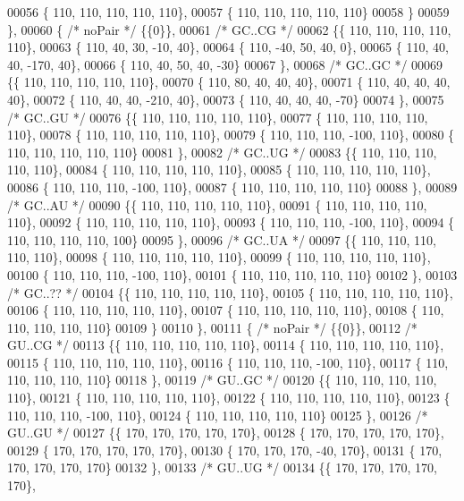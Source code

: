 \begin{DoxyCode}
00056 \{ 110, 110, 110, 110, 110\},
00057 \{ 110, 110, 110, 110, 110\}
00058 \}
00059 \},
00060 \{ \textcolor{comment}{/* noPair */} \{\{0\}\},
00061 \textcolor{comment}{/* GC..CG */}
00062 \{\{ 110, 110, 110, 110, 110\},
00063 \{ 110,  40,  30, -10,  40\},
00064 \{ 110, -40,  50,  40,   0\},
00065 \{ 110,  40,  40, -170,  40\},
00066 \{ 110,  40,  50,  40, -30\}
00067 \},
00068 \textcolor{comment}{/* GC..GC */}
00069 \{\{ 110, 110, 110, 110, 110\},
00070 \{ 110,  80,  40,  40,  40\},
00071 \{ 110,  40,  40,  40,  40\},
00072 \{ 110,  40,  40, -210,  40\},
00073 \{ 110,  40,  40,  40, -70\}
00074 \},
00075 \textcolor{comment}{/* GC..GU */}
00076 \{\{ 110, 110, 110, 110, 110\},
00077 \{ 110, 110, 110, 110, 110\},
00078 \{ 110, 110, 110, 110, 110\},
00079 \{ 110, 110, 110, -100, 110\},
00080 \{ 110, 110, 110, 110, 110\}
00081 \},
00082 \textcolor{comment}{/* GC..UG */}
00083 \{\{ 110, 110, 110, 110, 110\},
00084 \{ 110, 110, 110, 110, 110\},
00085 \{ 110, 110, 110, 110, 110\},
00086 \{ 110, 110, 110, -100, 110\},
00087 \{ 110, 110, 110, 110, 110\}
00088 \},
00089 \textcolor{comment}{/* GC..AU */}
00090 \{\{ 110, 110, 110, 110, 110\},
00091 \{ 110, 110, 110, 110, 110\},
00092 \{ 110, 110, 110, 110, 110\},
00093 \{ 110, 110, 110, -100, 110\},
00094 \{ 110, 110, 110, 110, 100\}
00095 \},
00096 \textcolor{comment}{/* GC..UA */}
00097 \{\{ 110, 110, 110, 110, 110\},
00098 \{ 110, 110, 110, 110, 110\},
00099 \{ 110, 110, 110, 110, 110\},
00100 \{ 110, 110, 110, -100, 110\},
00101 \{ 110, 110, 110, 110, 110\}
00102 \},
00103 \textcolor{comment}{/* GC..?? */}
00104 \{\{ 110, 110, 110, 110, 110\},
00105 \{ 110, 110, 110, 110, 110\},
00106 \{ 110, 110, 110, 110, 110\},
00107 \{ 110, 110, 110, 110, 110\},
00108 \{ 110, 110, 110, 110, 110\}
00109 \}
00110 \},
00111 \{ \textcolor{comment}{/* noPair */} \{\{0\}\},
00112 \textcolor{comment}{/* GU..CG */}
00113 \{\{ 110, 110, 110, 110, 110\},
00114 \{ 110, 110, 110, 110, 110\},
00115 \{ 110, 110, 110, 110, 110\},
00116 \{ 110, 110, 110, -100, 110\},
00117 \{ 110, 110, 110, 110, 110\}
00118 \},
00119 \textcolor{comment}{/* GU..GC */}
00120 \{\{ 110, 110, 110, 110, 110\},
00121 \{ 110, 110, 110, 110, 110\},
00122 \{ 110, 110, 110, 110, 110\},
00123 \{ 110, 110, 110, -100, 110\},
00124 \{ 110, 110, 110, 110, 110\}
00125 \},
00126 \textcolor{comment}{/* GU..GU */}
00127 \{\{ 170, 170, 170, 170, 170\},
00128 \{ 170, 170, 170, 170, 170\},
00129 \{ 170, 170, 170, 170, 170\},
00130 \{ 170, 170, 170, -40, 170\},
00131 \{ 170, 170, 170, 170, 170\}
00132 \},
00133 \textcolor{comment}{/* GU..UG */}
00134 \{\{ 170, 170, 170, 170, 170\},

\end{DoxyCode}
